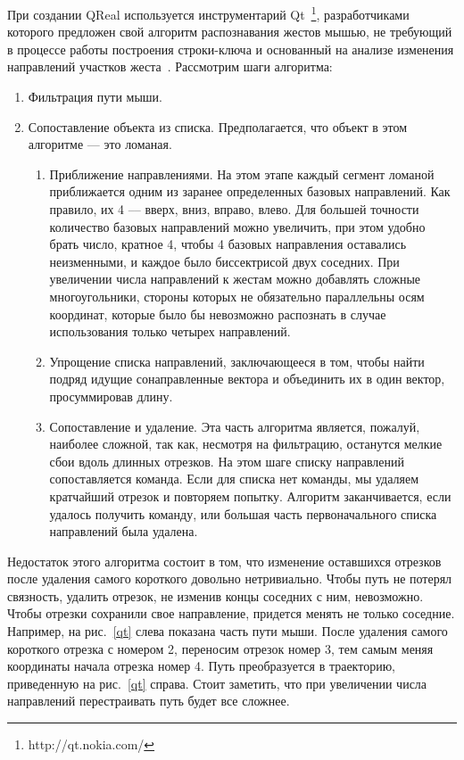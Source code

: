 \documentclass[a5paper]{article}
\begin{document}
При создании QReal используется инструментарий Qt~\footnote{http://qt.nokia.com/}, разработчиками которого предложен свой алгоритм распознавания жестов мышью,
не требующий в процессе работы построения строки-ключа и основанный на анализе изменения направлений участков жеста~\cite{qtGestures}. Рассмотрим шаги алгоритма:
\begin{enumerate}
  \item Фильтрация пути мыши.
  \item Сопоставление объекта из списка. Предполагается, что объект в этом алгоритме --- это ломаная.
  \begin{enumerate}
    \item Приближение направлениями. На этом этапе каждый сегмент ломаной приближается одним из заранее определенных базовых направлений. 
Как правило, их 4 --– вверх, вниз, вправо, влево. Для большей точности количество базовых направлений можно увеличить, при этом удобно 
брать число, кратное 4, чтобы 4 базовых направления оставались неизменными, и каждое было биссектрисой двух соседних. При увеличении числа 
направлений к жестам можно добавлять сложные многоугольники, стороны которых не обязательно параллельны осям координат, которые было бы 
невозможно распознать в случае использования только четырех направлений.
    \item Упрощение списка направлений, заключающееся в том, чтобы найти подряд идущие сонаправленные вектора и объединить их в 
один вектор, просуммировав длину.
    \item Сопоставление и удаление. Эта часть алгоритма является, пожалуй, наиболее сложной, так как, несмотря на фильтрацию, останутся 
мелкие сбои вдоль длинных отрезков. На этом шаге списку направлений сопоставляется команда. Если для списка нет команды, мы удаляем 
кратчайший отрезок и повторяем попытку. Алгоритм заканчивается, если удалось получить команду, или большая часть первоначального списка 
направлений была удалена.
  \end{enumerate}
\end{enumerate}

Недостаток этого алгоритма состоит в том, что изменение оставшихся отрезков после удаления самого короткого довольно нетривиально. 
Чтобы путь не потерял связность, удалить отрезок, не изменив концы соседних с ним, невозможно. Чтобы отрезки сохранили свое направление, 
придется менять не только соседние. Например, на рис.~\ref{qt} слева показана часть пути мыши. После удаления самого короткого отрезка с номером 2, 
переносим отрезок номер 3, тем самым меняя координаты начала отрезка номер 4. Путь преобразуется в траекторию, приведенную на рис.~\ref{qt} справа.
Стоит заметить, что при увеличении числа направлений перестраивать путь будет все сложнее. 
\end{document}
